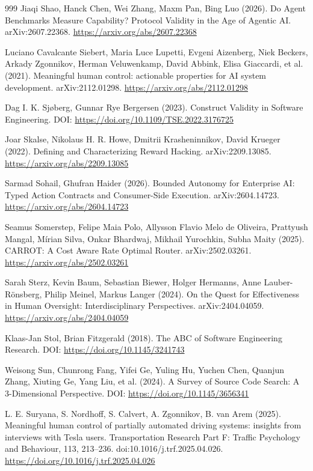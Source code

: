 \begin{thebibliography}{999}
 Jiaqi Shao, Hanck Chen, Wei Zhang, Maxm Pan, Bing Luo (2026). Do Agent Benchmarks Measure Capability? Protocol Validity in the Age of Agentic AI. arXiv:2607.22368. \url{https://arxiv.org/abs/2607.22368}

 Luciano Cavalcante Siebert, Maria Luce Lupetti, Evgeni Aizenberg, Niek Beckers, Arkady Zgonnikov, Herman Veluwenkamp, David Abbink, Elisa Giaccardi, et al. (2021). Meaningful human control: actionable properties for AI system development. arXiv:2112.01298. \url{https://arxiv.org/abs/2112.01298}

 Dag I. K. Sj\o{}berg, Gunnar Rye Bergersen (2023). Construct Validity in Software Engineering. DOI: \url{https://doi.org/10.1109/TSE.2022.3176725}

 Joar Skalse, Nikolaus H. R. Howe, Dmitrii Krasheninnikov, David Krueger (2022). Defining and Characterizing Reward Hacking. arXiv:2209.13085. \url{https://arxiv.org/abs/2209.13085}

 Sarmad Sohail, Ghufran Haider (2026). Bounded Autonomy for Enterprise AI: Typed Action Contracts and Consumer-Side Execution. arXiv:2604.14723. \url{https://arxiv.org/abs/2604.14723}

 Seamus Somerstep, Felipe Maia Polo, Allysson Flavio Melo de Oliveira, Prattyush Mangal, M\'{i}rian Silva, Onkar Bhardwaj, Mikhail Yurochkin, Subha Maity (2025). CARROT: A Cost Aware Rate Optimal Router. arXiv:2502.03261. \url{https://arxiv.org/abs/2502.03261}

 Sarah Sterz, Kevin Baum, Sebastian Biewer, Holger Hermanns, Anne Lauber-R\"{o}nsberg, Philip Meinel, Markus Langer (2024). On the Quest for Effectiveness in Human Oversight: Interdisciplinary Perspectives. arXiv:2404.04059. \url{https://arxiv.org/abs/2404.04059}

 Klaas-Jan Stol, Brian Fitzgerald (2018). The ABC of Software Engineering Research. DOI: \url{https://doi.org/10.1145/3241743}

 Weisong Sun, Chunrong Fang, Yifei Ge, Yuling Hu, Yuchen Chen, Quanjun Zhang, Xiuting Ge, Yang Liu, et al. (2024). A Survey of Source Code Search: A 3-Dimensional Perspective. DOI: \url{https://doi.org/10.1145/3656341}

 L. E. Suryana, S. Nordhoff, S. Calvert, A. Zgonnikov, B. van Arem (2025). Meaningful human control of partially automated driving systems: insights from interviews with Tesla users. Transportation Research Part F: Traffic Psychology and Behaviour, 113, 213--236. doi:10.1016/j.trf.2025.04.026. \url{https://doi.org/10.1016/j.trf.2025.04.026}


\end{thebibliography}
